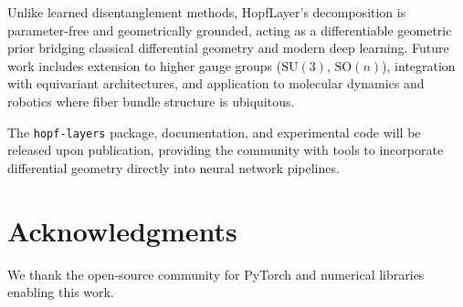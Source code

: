\documentclass[10pt,twocolumn]{article}
\newcommand{\SU}{\mathrm{SU}}
\newcommand{\SO}{\mathrm{SO}}
\begin{document}
Unlike learned disentanglement methods, HopfLayer's decomposition is parameter-free and geometrically grounded, acting as a differentiable geometric prior bridging classical differential geometry and modern deep learning. Future work includes extension to higher gauge groups ($\SU(3)$, $\SO(n)$), integration with equivariant architectures, and application to molecular dynamics and robotics where fiber bundle structure is ubiquitous.

The \texttt{hopf-layers} package, documentation, and experimental code will be released upon publication, providing the community with tools to incorporate differential geometry directly into neural network pipelines.

\section*{Acknowledgments}

We thank the open-source community for PyTorch and numerical libraries enabling this work.



\end{document}
